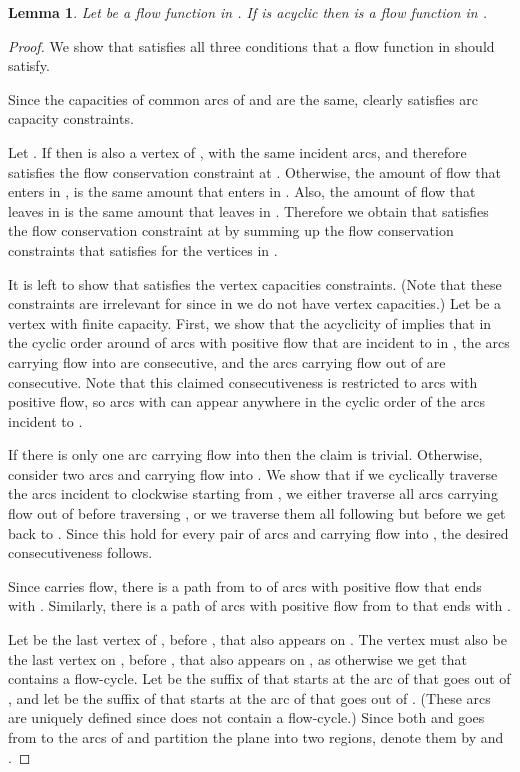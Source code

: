 \documentclass[a4paper,11pt]{article}
\newtheorem{lemma}[theorem]{Lemma}
\begin{document}
\begin{lemma} \label{lem:acyc}
    Let  be a flow function in . If  is acyclic then 
is a flow function in .
\end{lemma}
\begin{proof}
We show that  satisfies all three
conditions that a flow function in  should satisfy.

Since the capacities of common arcs of  and   are  the same,
 clearly satisfies arc capacity constraints.

Let . If  then  is also a vertex of , with the same incident arcs,
and therefore  satisfies the flow conservation constraint at
. Otherwise,  the amount of flow that enters  in ,
is the same amount that enters  in . Also, the amount
of flow that leaves  in  is the same amount that leaves
 in . Therefore we obtain that  satisfies the flow
conservation constraint at  by summing up the flow conservation
constraints that  satisfies for the vertices in .

It  is left to show that  satisfies the vertex capacities
constraints. (Note that these constraints are irrelevant for 
since in  we do not have vertex capacities.) Let  be a
vertex with finite capacity.  First, we show that the acyclicity of
 implies that in the cyclic order around  of arcs with positive
flow that are incident to  in , the arcs carrying flow into
 are consecutive, and the arcs carrying flow out of  are
consecutive. Note that this claimed consecutiveness is restricted to
arcs with positive flow, so arcs  with  can appear
anywhere in the cyclic order of the arcs incident to .


If there is only one arc carrying
 flow into  then the
claim is trivial. Otherwise, consider two arcs  and  carrying
flow  into . We  show that if we cyclically traverse the arcs
incident to  clockwise starting from , we either traverse all
arcs carrying flow out of  before traversing , or we traverse
them all following  but before we get back to .
 Since this hold for every pair of arcs  and 
carrying flow into , the desired consecutiveness follows.

Since  carries flow,
there is a path  from  to  of arcs with positive flow that
ends with . Similarly, there is a path  of arcs with positive
flow from  to  that ends with .

Let  be the last vertex of , before , that also
appears on . The vertex  must also be the last vertex on ,
before ,
that also appears on , as otherwise we get that  contains a
flow-cycle.
Let  be the suffix of  that starts at the arc of  that
goes out of , and let  be the suffix of  that starts at
the arc of  that goes out of . (These arcs are uniquely
defined since  does not contain a flow-cycle.) Since both
 and  goes from  to  the arcs of  and  partition
the plane into two regions, denote them by  and .


\end{proof}
\end{document}
